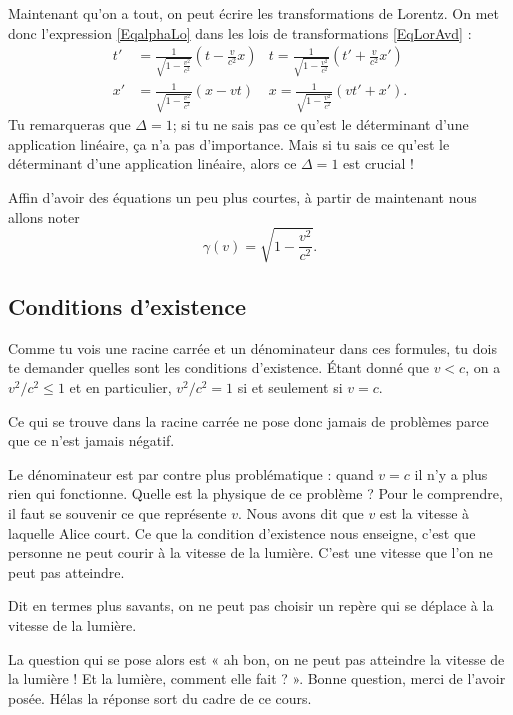 Maintenant qu'on a tout, on peut écrire les transformations de Lorentz. On met donc l'expression \eqref{EqalphaLo} dans les lois de transformations \eqref{EqLorAvd} :
\begin{equation}
\begin{aligned}		\label{EqTrLorentz}
  t'&= \frac{1}{ \sqrt{1-\frac{ v^2 }{ c^2 }} }\left( t-\frac{ v }{ c^2 }x \right)	& t=	\frac{1}{ \sqrt{1-\frac{ v^2 }{ c^2 }} }\left(t'+\frac{ v }{ c^2 }x'\right)\\
x'&=\frac{1}{ \sqrt{1-\frac{ v^2 }{ c^2 }} }(x-vt)	&x=\frac{1}{ \sqrt{1-\frac{ v^2 }{ c^2 }} }(vt'+x').
\end{aligned}
\end{equation}
Tu remarqueras que $\Delta=1$; si tu ne sais pas ce qu'est le déterminant d'une application linéaire, ça n'a pas d'importance. Mais si tu sais ce qu'est le déterminant d'une application linéaire, alors ce $\Delta=1$ est crucial !

Affin d'avoir des équations un peu plus courtes, à partir de maintenant nous allons noter
\[
  \gamma(v)=\sqrt{1-\frac{ v^2 }{ c^2 }}.
\]


\subsection{Conditions d'existence}

Comme tu vois une racine carrée et un dénominateur dans ces formules, tu dois te demander quelles sont les conditions d'existence. Étant donné que $v<c$, on a $v^2/c^2\leq 1$ et en particulier, $v^2/c^2=1$ si et seulement si $v=c$.

Ce qui se trouve dans la racine carrée ne pose donc jamais de problèmes parce que ce n'est jamais négatif.

Le dénominateur est par contre plus problématique : quand $v=c$ il n'y a plus rien qui fonctionne. Quelle est la physique de ce problème ? Pour le comprendre, il faut se souvenir ce que représente $v$. Nous avons dit que $v$ est la vitesse à laquelle Alice court. Ce que la condition d'existence nous enseigne, c'est que personne ne peut courir à la vitesse de la lumière. C'est une vitesse que l'on ne peut pas atteindre.

Dit en termes plus savants, on ne peut pas choisir un repère qui se déplace à la vitesse de la lumière.

La question qui se pose alors est « ah bon, on ne peut pas atteindre la vitesse de la lumière ! Et la lumière, comment elle fait ? ». Bonne question, merci de l'avoir posée. Hélas la réponse sort du cadre de ce cours.

